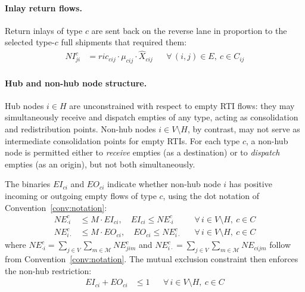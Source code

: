 
\paragraph{Inlay return flows.}
Return inlays of type $c$ are sent back on the reverse lane in
proportion to the selected type-$c$ full shipments that required
them:
%
\begin{align}
  NI^{c}_{ji}
  &= ric_{cij} \cdot \mu_{cij} \cdot \hat{X}_{cij}
  && \forall\,(i,j)\in E,\ c\in C_{ij}
  \label{eq:inlay}
\end{align}


\paragraph{Hub and non-hub node structure.}
Hub nodes $i \in H$ are unconstrained with respect to empty RTI
flows: they may simultaneously receive and dispatch empties of any
type, acting as consolidation and redistribution points.
Non-hub nodes $i \in V \setminus H$, by contrast, may not serve
as intermediate consolidation points for empty RTIs. For each
type $c$, a non-hub node is permitted either to \emph{receive}
empties (as a destination) or to \emph{dispatch} empties (as an
origin), but not both simultaneously.

The binaries $EI_{ci}$ and $EO_{ci}$ indicate whether
non-hub node $i$ has positive incoming or outgoing empty flows
of type $c$, using the dot notation of
Convention~\ref{conv:notation}:
%
\begin{align}
  NE^{c}_{\cdot i}
    &\leq M \cdot EI_{ci},
  \quad
  EI_{ci}
    \leq NE^{c}_{\cdot i}
  && \forall\, i \in V\setminus H,\ c \in C
  \label{eq:hub-EI-link}\\[4pt]
  NE^{c}_{i \cdot}
    &\leq M \cdot EO_{ci},
  \quad
  EO_{ci}
    \leq NE^{c}_{i \cdot}
  && \forall\, i \in V\setminus H,\ c \in C
  \label{eq:hub-EO-link}
\end{align}
%
where $NE^{c}_{\cdot i} = \sum_{j \in V}\sum_{m \in \mathcal{M}}
NE^{c}_{jim}$ and $NE^{c}_{i \cdot} = \sum_{j \in V}
\sum_{m \in \mathcal{M}} NE_{cijm}$ follow from
Convention~\ref{conv:notation}.
The mutual exclusion constraint then enforces the non-hub
restriction:
%
\begin{align}
  EI_{ci} + EO_{ci} &\leq 1
  && \forall\, i \in V\setminus H,\ c \in C
  \label{eq:non-hub}
\end{align}

